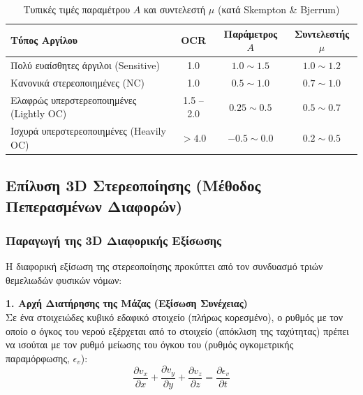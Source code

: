 \documentclass[11pt,a4paper]{article}
\begin{document}
\begin{table}[H]
  \centering
  \caption{Τυπικές τιμές παραμέτρου $A$ και συντελεστή $\mu$ (κατά Skempton \& Bjerrum)}\label{tab:mu}
  \begin{tabular}{lccc}
    \toprule
    \textbf{Τύπος Αργίλου} & \textbf{OCR} & \textbf{Παράμετρος $A$} & \textbf{Συντελεστής $\mu$} \\
    \midrule
    Πολύ ευαίσθητες άργιλοι (Sensitive) & 1.0 & $1.0 \sim 1.5$ & $1.0 \sim 1.2$ \\
    Κανονικά στερεοποιημένες (NC) & 1.0 & $0.5 \sim 1.0$ & $0.7 \sim 1.0$ \\
    Ελαφρώς υπερστερεοποιημένες (Lightly OC) & 1.5 -- 2.0 & $0.25 \sim 0.5$ & $0.5 \sim 0.7$ \\
    Ισχυρά υπερστερεοποιημένες (Heavily OC) & $> 4.0$ & $-0.5 \sim 0.0$ & $0.2 \sim 0.5$ \\
    \bottomrule
  \end{tabular}
\end{table}

\subsection{Επίλυση 3D Στερεοποίησης (Μέθοδος Πεπερασμένων Διαφορών)}

\subsubsection{Παραγωγή της 3D Διαφορικής Εξίσωσης}

Η διαφορική εξίσωση της στερεοποίησης προκύπτει από τον συνδυασμό τριών θεμελιωδών φυσικών νόμων:

\textbf{1. Αρχή Διατήρησης της Μάζας (Εξίσωση Συνέχειας)}\\
Σε ένα στοιχειώδες κυβικό εδαφικό στοιχείο (πλήρως κορεσμένο), ο ρυθμός με τον οποίο ο όγκος του νερού εξέρχεται από το στοιχείο (απόκλιση της ταχύτητας) πρέπει να ισούται με τον ρυθμό μείωσης του όγκου του (ρυθμός ογκομετρικής παραμόρφωσης, $\epsilon_v$):
\begin{equation}
  \frac{\partial v_x}{\partial x} + \frac{\partial v_y}{\partial y} + \frac{\partial v_z}{\partial z} = \frac{\partial \epsilon_v}{\partial t}
\end{equation}
\end{document}
